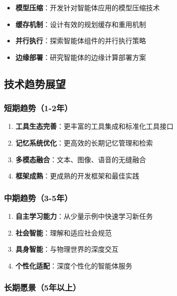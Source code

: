 \begin{itemize}[leftmargin=2em]
    \item \textbf{模型压缩}：开发针对智能体应用的模型压缩技术
    \item \textbf{缓存机制}：设计有效的规划缓存和重用机制
    \item \textbf{并行执行}：探索智能体组件的并行执行策略
    \item \textbf{边缘部署}：研究智能体的边缘计算部署方案
\end{itemize}

\subsection{技术趋势展望}

\subsubsection{短期趋势（1-2年）}

\begin{enumerate}[leftmargin=2em]
    \item \textbf{工具生态完善}：更丰富的工具集成和标准化工具接口
    \item \textbf{记忆系统优化}：更高效的长期记忆管理和检索
    \item \textbf{多模态融合}：文本、图像、语音的无缝融合
    \item \textbf{框架成熟}：更成熟的开发框架和最佳实践
\end{enumerate}

\subsubsection{中期趋势（3-5年）}

\begin{enumerate}[leftmargin=2em]
    \item \textbf{自主学习能力}：从少量示例中快速学习新任务
    \item \textbf{社会智能}：理解和适应社会规范
    \item \textbf{具身智能}：与物理世界的深度交互
    \item \textbf{个性化适配}：深度个性化的智能体服务
\end{enumerate}

\subsubsection{长期愿景（5年以上）}

